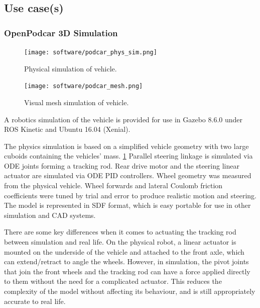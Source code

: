 \documentclass[a4paper]{article}
\begin{document}
\subsection{Use case(s)}\label{h.4q5g9edishy3}



\subsubsection{OpenPodcar 3D Simulation}

\begin{figure}
	\texttt{[image: software/podcar\_phys\_sim.png]}
	\caption{Physical simulation of vehicle.}
	\label{fig:physSim}
\end{figure}

\begin{figure}
	\texttt{[image: software/podcar\_mesh.png]}
	\caption{Visual mesh simulation of vehicle.}
	\label{fig:meshSim}
\end{figure}

A robotics simulation of the vehicle is provided for use in Gazebo 8.6.0 under ROS Kinetic and Ubuntu 16.04 (Xenial).


The physics simulation is based on a simplified vehicle geometry with two large cuboids containing the vehicles’ mass. \ref{fig:physSim} Parallel steering linkage is simulated via ODE joints forming a tracking rod. Rear drive motor and the steering linear actuator are simulated via ODE PID controllers.  Wheel geometry was measured from the physical vehicle.   Wheel forwards and lateral Coulomb friction coefficients were tuned by trial and error to produce realistic motion and steering.  The model is represented in SDF format, which is easy portable for use in other simulation and CAD systems.

There are some key differences when it comes to actuating the tracking rod between simulation and real life. On the physical robot, a linear actuator is mounted on the underside of the vehicle and attached to the front axle, which can extend/retract to angle the wheels. However, in simulation, the pivot joints that join the front wheels and the tracking rod can have a force applied directly to them without the need for a complicated actuator. This reduces the complexity of the model without affecting its behaviour, and is still appropriately accurate to real life.
\end{document}
